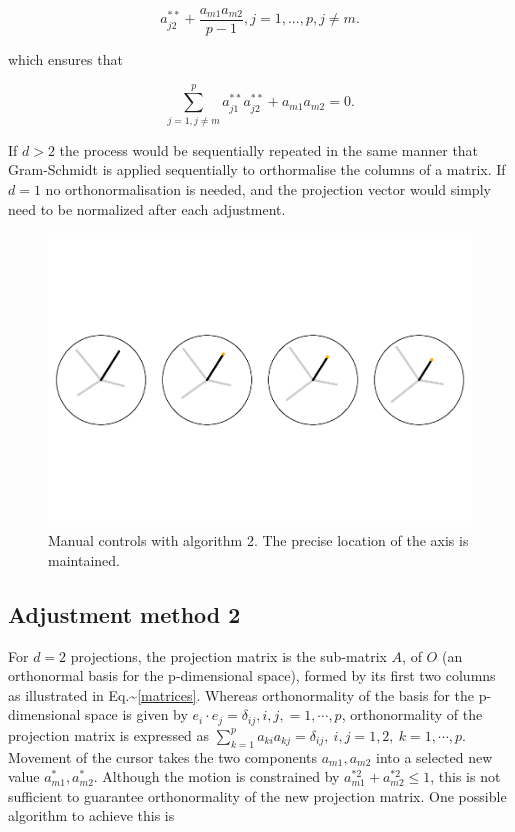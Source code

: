 \documentclass[]{interact}
\theoremstyle{plain}%
\theoremstyle{definition}
\theoremstyle{remark}
\begin{document}
\[a^{**}_{j2}+\frac{a_{m1}a_{m2}}{p-1}, j=1, ..., p, j\neq m.\]

which ensures that

\[\sum_{j=1, j\neq m}^p a^{**}_{j1}a^{**}_{j2} + a_{m1}a_{m2} = 0.\]

If \(d>2\) the process would be sequentially repeated in the same manner
that Gram-Schmidt is applied sequentially to orthormalise the columns of
a matrix. If \(d=1\) no orthonormalisation is needed, and the projection
vector would simply need to be normalized after each adjustment.

\begin{figure}
\includegraphics[width=1\linewidth]{arxiv_files/figure-latex/othermethod-1} \caption{Manual controls with algorithm 2. The precise location of the axis is maintained.}\label{fig:othermethod}
\end{figure}

\hypertarget{adjustment-method-2}{%
\subsection{Adjustment method 2}\label{adjustment-method-2}}

For \(d=2\) projections, the projection matrix is the sub-matrix \(A\),
of \(O\) (an orthonormal basis for the p-dimensional space), formed by
its first two columns as illustrated in
Eq.\textasciitilde{}\ref{matrices}. Whereas orthonormality of the basis
for the p-dimensional space is given by
\(e_i\cdot e_j=\delta_{ij},{i,j,=1,\cdots, p}\), orthonormality of the
projection matrix is expressed as
\(\sum_{k=1}^p a_{ki} a_{kj}=\delta_{ij}, ~{i,j=1,2}, ~{k=1,\cdots,p}\).
Movement of the cursor takes the two components \({a_{m1},a_{m2}}\) into
a selected new value \({a^*_{m1},a^*_{m2}}\). Although the motion is
constrained by \(a^{*2}_{m1}+a^{*2}_{m2}\leq 1\), this is not sufficient
to guarantee orthonormality of the new projection matrix. One possible
algorithm to achieve this is
\end{document}
